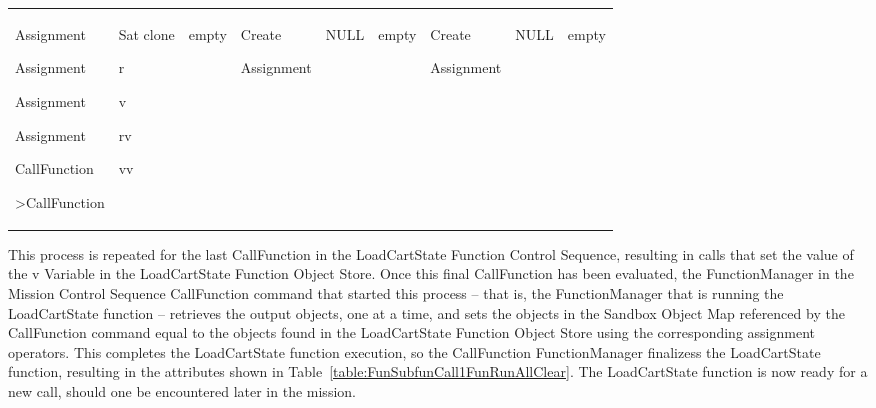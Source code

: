 \begin{center}
\begin{supertabular}{|p{0.75in}|p{0.45in}|p{0.45in}|p{0.69in}|p{0.45in}|p{0.45in}|p{0.69in}|
p{0.44in}|p{0.44in}|}
\begin{small}
Assignment

Assignment

Assignment

Assignment

CallFunction

>CallFunction
\end{small} &
\begin{small}
Sat clone

r

v

rv

vv
\end{small} &
\begin{small}
empty
\end{small} &
\begin{small}
Create

Assignment
\end{small} &
\begin{small}
NULL
\end{small} &
\begin{small}
empty\end{small} &
\begin{small}
Create

Assignment
\end{small} &
\begin{small}
NULL
\end{small} &
\begin{small}
empty
\end{small} \\
\end{supertabular}
\end{center}

This process is repeated for the last CallFunction in the LoadCartState Function Control Sequence,
resulting in calls that set the value of the v Variable in the LoadCartState Function Object Store. 
Once this final CallFunction has been evaluated, the FunctionManager in the Mission Control Sequence
CallFunction command that started this process -- that is, the FunctionManager that is running the
LoadCartState function -- retrieves the output objects, one at a time, and sets the objects in the
Sandbox Object Map referenced by the CallFunction command equal to the objects found in the
LoadCartState Function Object Store using the corresponding assignment operators.  This completes
the LoadCartState function execution, so the CallFunction FunctionManager finalizess the
LoadCartState function, resulting in the attributes shown in
Table~\ref{table:FunSubfunCall1FunRunAllClear}.  The LoadCartState function is now ready for a new
call, should one be encountered later in the mission.

